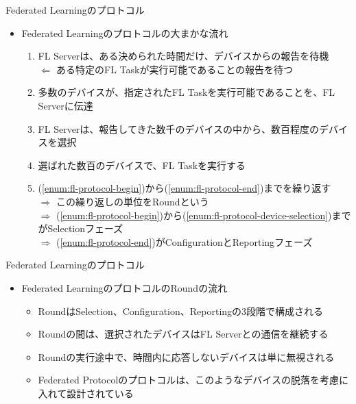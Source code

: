 \documentclass[dvipdfmx,notheorems,t]{beamer}
\begin{document}
\begin{frame}{Federated Learningのプロトコル}

\begin{itemize}
	\item Federated Learningのプロトコルの大まかな流れ
	\begin{enumerate}
		\item FL Serverは、ある決められた時間だけ、デバイスからの報告を待機 \label{enum:fl-protocol-begin} \\
		$\Leftarrow$ ある特定のFL Taskが実行可能であることの報告を待つ
		\newline
		\item 多数のデバイスが、指定されたFL Taskを実行可能であることを、FL Serverに伝達
		\newline
		\item FL Serverは、報告してきた数千のデバイスの中から、数百程度のデバイスを選択 \label{enum:fl-protocol-device-selection}
		\newline
		\item 選ばれた数百のデバイスで、FL Taskを実行する \label{enum:fl-protocol-end}
		\newline
		\item (\ref{enum:fl-protocol-begin})から(\ref{enum:fl-protocol-end})までを繰り返す \\
		$\Rightarrow$ この繰り返しの単位をRoundという \\
		$\Rightarrow$ (\ref{enum:fl-protocol-begin})から(\ref{enum:fl-protocol-device-selection})までが\alert{Selection}フェーズ \\
		$\Rightarrow$ (\ref{enum:fl-protocol-end})が\alert{Configuration}と\alert{Reporting}フェーズ
	\end{enumerate}
\end{itemize}

\end{frame}

\begin{frame}{Federated Learningのプロトコル}

\begin{itemize}
	\item Federated LearningのプロトコルのRoundの流れ
	\begin{itemize}
		\item Roundは\alert{Selection}、\alert{Configuration}、\alert{Reporting}の3段階で構成される
		\item Roundの間は、選択されたデバイスはFL Serverとの通信を継続する
		\newline
		
		\item Roundの実行途中で、時間内に応答しないデバイスは\alert{単に無視}される
		\item Federated Protocolのプロトコルは、このようなデバイスの脱落を考慮に入れて設計されている
	\end{itemize}
\end{itemize}

\end{frame}
\end{document}
